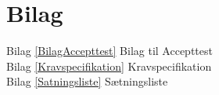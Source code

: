 \chapter{Bilag}\label{kapitel_Bilag}

Bilag \ref{BilagAccepttest} Bilag til Accepttest \\
Bilag \ref{Kravspecifikation} Kravspecifikation \\
Bilag \ref{Satningsliste} Sætningsliste